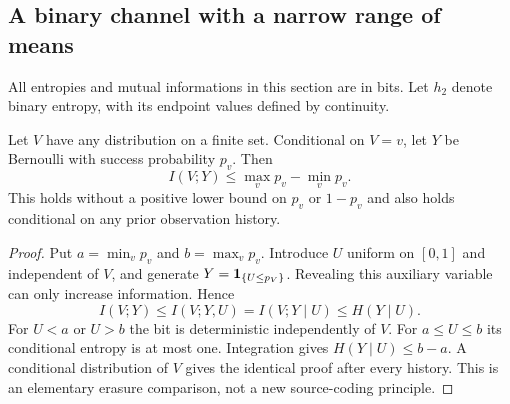 \subsection{A binary channel with a narrow range of means}
All entropies and mutual informations in this section are in bits.
Let $h_2$ denote binary entropy, with its endpoint values defined by
continuity.

\begin{lemma}
\label{lem:binary-range}
Let $V$ have any distribution on a finite set. Conditional on $V=v$,
let $Y$ be Bernoulli with success probability $p_v$. Then
\begin{equation}\label{eq:binary-range}
                     I(V;Y)\le \max_v p_v-\min_v p_v.
\end{equation}
This holds without a positive lower bound on $p_v$ or $1-p_v$ and
also holds conditional on any prior observation history.
\end{lemma}
\begin{proof}
Put $a=\min_vp_v$ and $b=\max_vp_v$. Introduce $U$ uniform on $[0,1]$
and independent of $V$, and generate $Y=\mathbf 1_{\{U\le p_V\}}$.
Revealing this auxiliary variable can only increase information. Hence
\[
 I(V;Y)\le I(V;Y,U)=I(V;Y\mid U)\le H(Y\mid U).
\]
For $U<a$ or $U>b$ the bit is deterministic independently of $V$.
For $a\le U\le b$ its conditional entropy is at most one.
Integration gives $H(Y\mid U)\le b-a$. A conditional distribution
of $V$ gives the identical proof after every history. This is an
elementary erasure comparison, not a new source-coding principle.
\end{proof}

